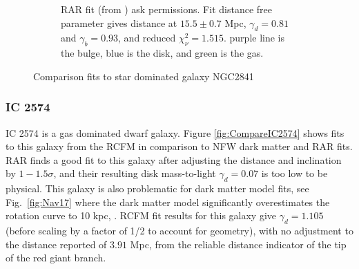\documentclass[reprint,%
 amsmath,amssymb,
 aps,
]{revtex4-1}
\begin{document}
\begin{figure}[ht]
\begin{subfigure}[b]{0.5\linewidth}
    \caption{RAR fit (from \citet{Li_2018})   ask permissions. Fit distance free parameter gives  distance at $15.5\pm 0.7$ Mpc, $\gamma_d =0.81 $ and $\gamma_b =	0.93 $, and reduced $\chi^2_\nu = 1.515$. purple line is the bulge, blue is the disk, and green  is the gas.} 
    \label{fig:2841Li2018Rar} 
    \vspace{4ex}
  \end{subfigure} 
  \caption{Comparison fits to star dominated galaxy NGC2841 }
  \label{fig:CompareNGC2841} 
\end{figure}

\subsubsection{IC 2574}

IC 2574 is  a gas dominated dwarf galaxy.
Figure \ref{fig:CompareIC2574} shows   fits to this galaxy from  the  RCFM in comparison to  NFW dark matter and RAR fits. 
 RAR finds a good fit to this galaxy    after adjusting
the  distance and inclination by $1-1.5 \sigma$, and their resulting disk mass-to-light 
$\gamma_d  = 0.07$ is  too low to be physical. 
This galaxy is also problematic for dark matter model fits, see Fig.~\ref{fig:Nav17} where the dark matter model significantly overestimates  the rotation curve to 10 kpc, \cite{2017MNRAS.471.1841N}.  
RCFM fit results for this galaxy give  $\gamma_d = 1.105$ (before scaling by  a factor of 1/2 to account for geometry), with no adjustment to the distance reported of  $3.91$ Mpc,  from the reliable distance indicator of    the tip of the red giant branch. 
\end{document}
